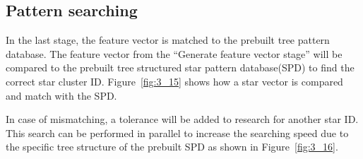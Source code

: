 \subsection{Pattern searching}

In the last stage, the feature vector is matched to the prebuilt tree pattern database. The feature vector from the “Generate feature vector stage” will be compared to the prebuilt tree structured star pattern database(SPD) to find the correct star cluster ID. Figure~\ref{fig:3_15} shows how a star vector is compared and match with the SPD. \\


\noindent In case of mismatching, a tolerance will be added to research for another star ID. This search can be performed in parallel to increase the searching speed due to the specific tree structure of the prebuilt SPD as shown in Figure~\ref{fig:3_16}.

